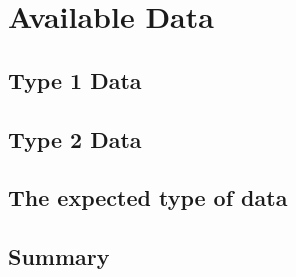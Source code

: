 \chapter{Available Data}
\label{cha:available_data}


\section{Type 1 Data} %
\label{sec:type_1_data}

\section{Type 2 Data} %
\label{sec:type_2_data}

\section{The expected type of data}
\label{sec:expected_data}

\section{Summary} %
\label{sec:available_data_summary}

